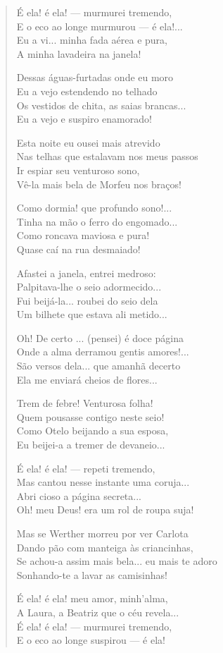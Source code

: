 \begin{verse}
É ela! é ela! — murmurei tremendo, \\
E o eco ao longe murmurou — é ela!... \\
Eu a vi... minha fada aérea e pura, \\
A minha lavadeira na janela!
						
Dessas águas-furtadas onde eu moro \\
Eu a vejo estendendo no telhado \\
Os vestidos de chita, as saias brancas... \\
Eu a vejo e suspiro enamorado!
						
Esta noite eu ousei mais atrevido \\
Nas telhas que estalavam nos meus passos \\
Ir espiar seu venturoso sono, \\
Vê-la mais bela de Morfeu nos braços!
						
Como dormia! que profundo sono!... \\
Tinha na mão o ferro do engomado... \\
Como roncava maviosa e pura! \\
Quase caí na rua desmaiado!
						
Afastei a janela, entrei medroso: \\
Palpitava-lhe o seio adormecido... \\
Fui beijá-la... roubei do seio dela \\
Um bilhete que estava ali metido...
						
Oh! De certo ... (pensei) é doce página \\
Onde a alma derramou gentis amores!... \\
São versos dela... que amanhã decerto \\
Ela me enviará cheios de flores...

Trem de febre! Venturosa folha! \\
Quem pousasse contigo neste seio! \\
Como Otelo beijando a sua esposa, \\
Eu beijei-a a tremer de devaneio...

É ela! é ela! — repeti tremendo, \\
Mas cantou nesse instante uma coruja... \\
Abri cioso a página secreta... \\
Oh! meu Deus! era um rol de roupa suja!
						
Mas se Werther morreu por ver Carlota \\
Dando pão com manteiga às criancinhas, \\
Se achou-a assim mais bela... eu mais te adoro \\
Sonhando-te a lavar as camisinhas!
						
É ela! é ela! meu amor, minh’alma, \\
A Laura, a Beatriz que o céu revela... \\
É ela! é ela! — murmurei tremendo, \\
E o eco ao longe suspirou — é ela!
\end{verse}

